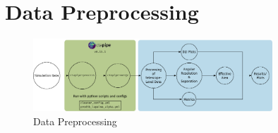 \chapter{Data Preprocessing}
\label{ch:data-preprocessing}

\begin{figure}
    \centering
    \includegraphics[width=0.8\textwidth]{graphics/data_pipeline.pdf}
    \caption{Data Preprocessing}
    \label{fig:data-preprocessing}
\end{figure}